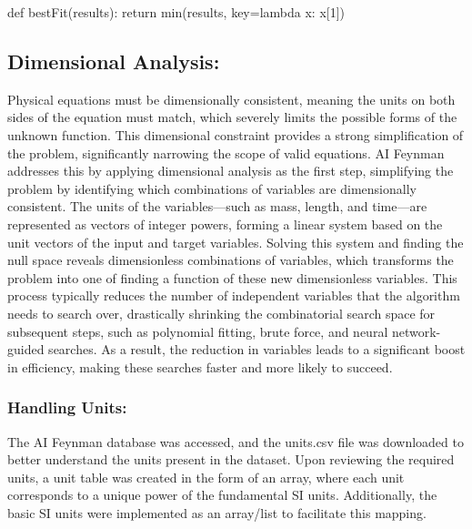\documentclass{article}
\begin{document}
def bestFit(results):
    return min(results, key=lambda x: x[1])



\subsection{Dimensional Analysis: }


Physical equations must be dimensionally consistent, meaning the units on both sides of the equation must match, which severely limits the possible forms of the unknown function. This dimensional constraint provides a strong simplification of the problem, significantly narrowing the scope of valid equations. AI Feynman addresses this by applying dimensional analysis as the first step, simplifying the problem by identifying which combinations of variables are dimensionally consistent. The units of the variables—such as mass, length, and time—are represented as vectors of integer powers, forming a linear system based on the unit vectors of the input and target variables. Solving this system and finding the null space reveals dimensionless combinations of variables, which transforms the problem into one of finding a function of these new dimensionless variables. This process typically reduces the number of independent variables that the algorithm needs to search over, drastically shrinking the combinatorial search space for subsequent steps, such as polynomial fitting, brute force, and neural network-guided searches. As a result, the reduction in variables leads to a significant boost in efficiency, making these searches faster and more likely to succeed.\\


\subsubsection{Handling Units:}


The AI Feynman database was accessed, and the units.csv file was downloaded to better understand the units present in the dataset. Upon reviewing the required units, a unit table was created in the form of an array, where each unit corresponds to a unique power of the fundamental SI units. Additionally, the basic SI units were implemented as an array/list to facilitate this mapping.\\
\end{document}
